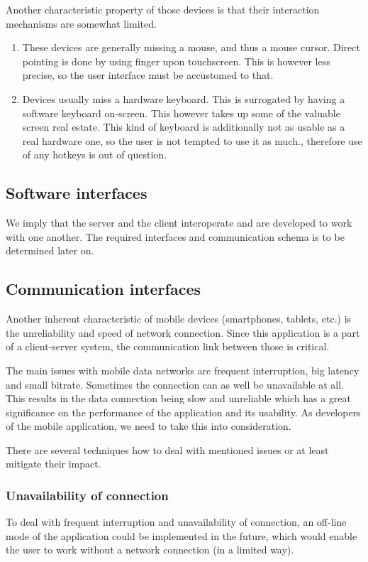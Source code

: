 \documentclass[11pt]{book}
\begin{document}
Another characteristic property of those devices is that their interaction mechanisms are somewhat limited.

\begin{enumerate}
  \item These devices are generally missing a mouse, and thus a mouse cursor. Direct pointing is done by using finger upon touchscreen. This is however less precise, so the user interface must be accustomed to that.
  \item Devices usually miss a hardware keyboard. This is surrogated by having a software keyboard on-screen. This however takes up some of the valuable screen real estate. This kind of keyboard is additionally not as usable as a real hardware one, so the user is not tempted to use it as much., therefore use of any hotkeys is out of question.
\end{enumerate}

\subsection{Software interfaces}
We imply that the server and the client interoperate and are developed to work with one another. The required interfaces and communication schema is to be determined later on. %

\subsection{Communication interfaces}
Another inherent characteristic of mobile devices (smartphones, tablets, etc.) is the unreliability and speed of network connection. Since this application is a part of a client-server system, the communication link between those is critical.

The main issues with mobile data networks are frequent interruption, big latency and small bitrate. Sometimes the connection can as well be unavailable at all. This results in the data connection being slow and unreliable which has a great significance on the performance of the application and its usability. As developers of the mobile application, we need to take this into consideration.

There are several techniques how to deal with mentioned issues or at least mitigate their impact.

\subsubsection{Unavailability of connection}\label{sec:req_unavailability_of_connection}
To deal with frequent interruption and unavailability of connection, an off-line mode of the application could be implemented in the future, which would enable the user to work without a network connection (in a limited way).
\end{document}
